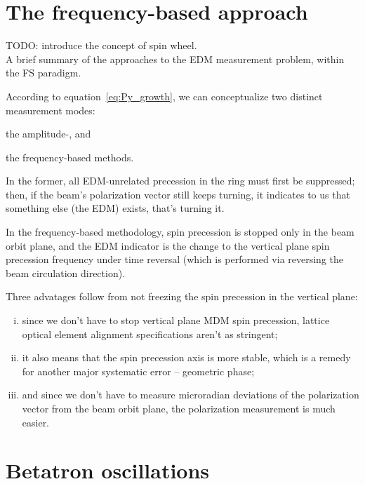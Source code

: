 \documentclass[]{elsarticle}
\begin{document}
\section{The frequency-based approach}
TODO: introduce the concept of spin wheel.\\

A brief summary of the approaches to the EDM measurement problem, within the FS paradigm.

According to equation~\eqref{eq:Py_growth}, we can conceptualize two distinct measurement modes:
\begin{enumerate*}
\item the amplitude-, and
\item the frequency-based methods.
\end{enumerate*}

In the former, all EDM-unrelated precession in the ring must first be suppressed; then, if the beam's
polarization vector still keeps turning, it indicates to us that something else (the EDM) exists,
that's turning it.

In the frequency-based methodology, spin precession is stopped only in the beam orbit plane, and the EDM
indicator is the change to the vertical plane spin precession frequency under time reversal (which is
performed via reversing the beam circulation direction).

Three advatages follow from not freezing the spin precession in the vertical plane:
\begin{enumerate}[(i)]
\item since we don't have to stop vertical plane MDM spin precession, lattice optical element alignment
  specifications aren't as stringent;
\item it also means that the spin precession axis is more stable, which is a remedy for another major
  systematic error -- geometric phase;\label{itm:advantages:stability}
\item and since we don't have to measure microradian deviations of the polarization vector from the
  beam orbit plane, the polarization measurement is much easier.
\end{enumerate}

\section{Betatron oscillations}
\end{document}
